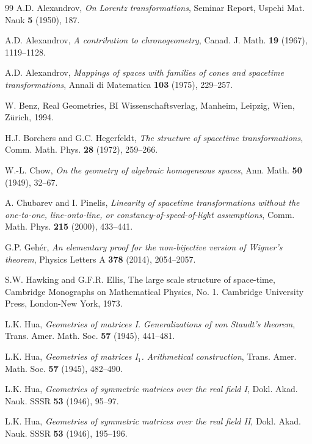 \documentclass[10pt]{amsart}
\theoremstyle{definition}
\theoremstyle{remark}
\numberwithin{subsection}{section}
\numberwithin{equation}{section}
\begin{document}

%
\begin{thebibliography}{99}
A.D. Alexandrov, \emph{On Lorentz transformations}, Seminar Report, Uspehi Mat. Nauk \textbf{5} (1950), 187.

A.D. Alexandrov, \emph{A contribution to chronogeometry}, Canad. J. Math. \textbf{19} (1967), 1119--1128.

A.D. Alexandrov, \emph{Mappings of spaces with families of cones and spacetime transformations}, Annali di Matematica \textbf{103} (1975), 229--257.

W. Benz, Real Geometries, BI Wissenschaftsverlag, Manheim, Leipzig, Wien, Z\" urich, 1994.

H.J. Borchers and G.C. Hegerfeldt, \emph{The structure of spacetime transformations}, Comm. Math. Phys. \textbf{28} (1972), 259--266.

W.-L. Chow, \emph{On the geometry of algebraic homogeneous spaces}, Ann. Math. \textbf{50} (1949), 32--67.


A. Chubarev and I. Pinelis, \emph{Linearity of spacetime transformations without the one-to-one, line-onto-line, or
constancy-of-speed-of-light assumptions}, Comm. Math. Phys. \textbf{215} (2000), 433--441.

G.P. Geh\' er, \emph{An elementary proof for the non-bijective version of Wigner's theorem},  Physics Letters A \textbf{378} (2014), 2054--2057.

S.W. Hawking and G.F.R. Ellis, The large scale structure of space-time, Cambridge Monographs on Mathematical Physics, No. 1. Cambridge University Press, London-New York, 1973.


L.K. Hua, \emph{Geometries of matrices I. Generalizations of von Staudt's
theorem}, Trans. Amer. Math. Soc. \textbf{57} (1945), 441--481.


L.K. Hua, \emph{Geometries of matrices I$_1$. Arithmetical
construction}, Trans. Amer. Math. Soc. \textbf{57} (1945), 482--490.

L.K. Hua, \emph{Geometries of symmetric matrices over the real field I},
Dokl. Akad. Nauk. SSSR \textbf{53} (1946), 95--97.

L.K. Hua, \emph{Geometries of symmetric matrices over the real field II},
Dokl. Akad. Nauk. SSSR \textbf{53} (1946), 195--196.


\end{thebibliography}
\end{document}

